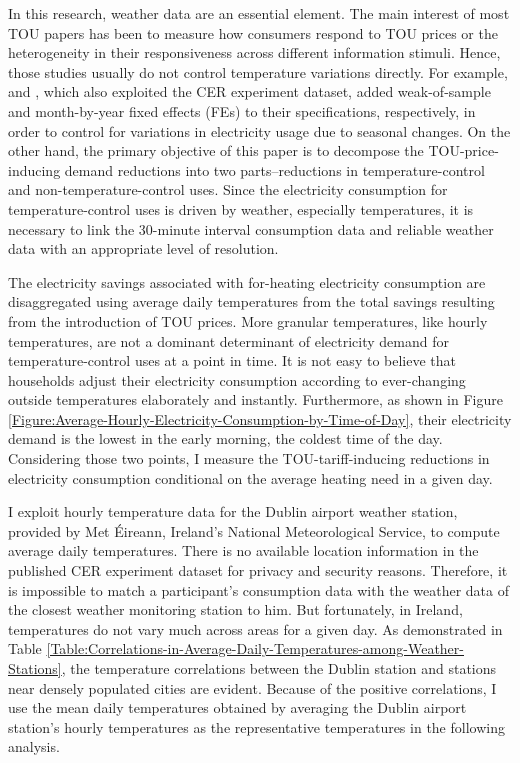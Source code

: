 In this research, weather data are an essential element. The main interest of most TOU papers has been to measure how consumers respond to TOU prices or the heterogeneity in their responsiveness across different information stimuli. Hence, those studies usually do not control temperature variations directly. For example, \cite{The-Effect-of-Information-on-TOU-Electricity-Use:An-Irish-Residential-Study_Pon_2017} and \cite{Peaking-Interest:How-Awareness-Drives-the-Effectiveness-of-Time-of-Use-Electricity-Pricing_Prest_2020}, which also exploited the CER experiment dataset, added weak-of-sample and month-by-year fixed effects (FEs) to their specifications, respectively, in order to control for variations in electricity usage due to seasonal changes. On the other hand, the primary objective of this paper is to decompose the TOU-price-inducing demand reductions into two parts--reductions in temperature-control and non-temperature-control uses. Since the electricity consumption for temperature-control uses is driven by weather, especially temperatures, it is necessary to link the 30-minute interval consumption data and reliable weather data with an appropriate level of resolution. 

The electricity savings associated with for-heating electricity consumption are disaggregated using average daily temperatures from the total savings resulting from the introduction of TOU prices. More granular temperatures, like hourly temperatures, are not a dominant determinant of electricity demand for temperature-control uses at a point in time. It is not easy to believe that households adjust their electricity consumption according to ever-changing outside temperatures elaborately and instantly. Furthermore, as shown in Figure \ref{Figure:Average-Hourly-Electricity-Consumption-by-Time-of-Day}, their electricity demand is the lowest in the early morning, the coldest time of the day. Considering those two points, I measure the TOU-tariff-inducing reductions in electricity consumption conditional on the average heating need in a given day. 

I exploit hourly temperature data for the Dublin airport weather station, provided by Met \'{E}ireann, Ireland's National Meteorological Service, to compute average daily temperatures. There is no available location information in the published CER experiment dataset for privacy and security reasons. Therefore, it is impossible to match a participant's consumption data with the weather data of the closest weather monitoring station to him. But fortunately, in Ireland, temperatures do not vary much across areas for a given day. As demonstrated in Table \ref{Table:Correlations-in-Average-Daily-Temperatures-among-Weather-Stations}, the temperature correlations between the Dublin station and stations near densely populated cities are evident. Because of the positive correlations, I use the mean daily temperatures obtained by averaging the Dublin airport station's hourly temperatures as the representative temperatures in the following analysis.

